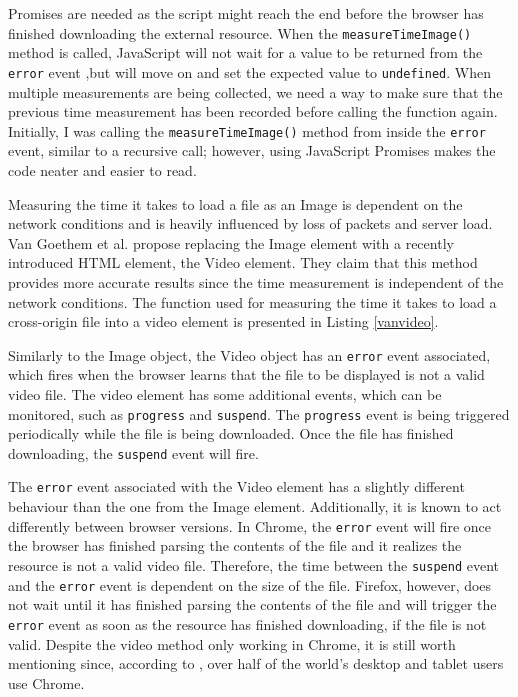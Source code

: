 \documentclass[10pt,a4paper,twoside]{book}
\begin{document}
Promises are needed as the script might reach the end before the browser has finished downloading the external resource. When the \texttt{measureTimeImage()} method is called, JavaScript will not wait for a value to be returned from the \texttt{error} event ,but will move on and set the expected value to \texttt{undefined}. When multiple measurements are being collected, we need a way to make sure that the previous time measurement has been recorded before calling the function again.  
Initially, I was calling the \texttt{measureTimeImage()} method from inside the \texttt{error} event, similar to a recursive call; however, using JavaScript Promises makes the code neater and easier to read.

Measuring the time it takes to load a file as an Image is dependent on the network conditions and is heavily influenced by loss of packets and server load. Van Goethem et al. \cite{van2015clock} propose replacing the Image element with a recently introduced HTML element, the Video element. They claim that this method provides more accurate results since the time measurement is independent of the network conditions. The function used for measuring the time it takes to load a cross-origin file into a video element is presented in Listing \ref{vanvideo}.

Similarly to the Image object, the Video object has an \texttt{error} event associated, which fires when the browser learns that the file to be displayed is not a valid video file. The video element has some additional events, which can be monitored, such as \texttt{progress} and \texttt{suspend}. The \texttt{progress} event is being triggered periodically while the file is being downloaded. Once the file has finished downloading, the \texttt{suspend} event will fire. 

The \texttt{error} event associated with the Video element has a slightly different behaviour than the one from the Image element. Additionally, it is known to act differently between browser versions. In Chrome, the \texttt{error} event will fire once the browser has finished parsing the contents of the file and it realizes the resource is not a valid video file. Therefore, the time between the \texttt{suspend} event and the \texttt{error} event is dependent on the size of the file. Firefox, however, does not wait until it has finished parsing the contents of the file and will trigger the \texttt{error} event as soon as the resource has finished downloading, if the file is not valid. Despite the video method only working in Chrome, it is still worth mentioning since, according to \cite{statcounter}, over half of the world's desktop and tablet users use Chrome.
\end{document}
